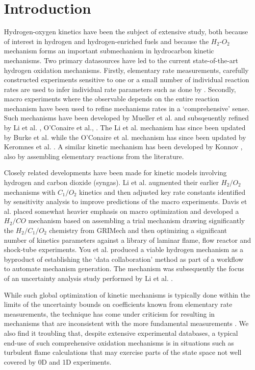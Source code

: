 \documentclass[preprint,3p,times,twocolumn]{elsarticle}
\begin{document}
\section{Introduction}
Hydrogen-oxygen kinetics have been the subject of extensive study,
both because of interest in hydrogen and hydrogen-enriched fuels and
because the $H_2$-$O_2$ mechanism forms an important submechanism in
hydrocarbon kinetic mechanisms. Two primary datasources have led to
the current state-of-the-art hydrogen oxidation mechanisms. Firstly,
elementary rate measurements, carefully constructed experiments
sensitive to one or a small number of individual reaction rates are
used to infer individual rate parameters such as done by
\cite{MuellerYD98, AshmanH98}. Secondly, macro experiments where the
observable depends on the entire reaction mechanism have been used to
refine mechanisms rates in a `comprehensive' sense. Such mechanisms
have been developed by Mueller et al.  \cite{YetterDR91, MuellerKYD99}
and subsqeuently refined by Li et al.  \cite{LiZKD04}, O'Conaire et
al., \cite{OConaireCSPW04}. The Li et al.  mechanism has since been
updated by Burke et al. \cite{BurkeCDJ10, BurkeCJDK11} while the
O'Conaire et al. mechanism has since been updated by Keromnes et
al. \cite{Keromnes_Many_Curran13}. A similar kinetic mechanism has
been developed by Konnov \cite{Konnov08}, also by assembling
elementary reactions from the literature.

Closely related developments have been made for kinetic models
involving hydrogen and carbon dioxide (syngas). Li et
al. \cite{LiZKCDS07} augmented their earlier $H_2/O_2$ mechanisms with
$C_1/O_2$ kinetics and then adjusted key rate constants identified by
sensitivity analysis to improve predictions of the macro
experiments. Davis et al.  \cite{DavisJWE05} placed somewhat heavier
emphasis on macro optimization and developed a $H_2/CO$ mechanism
based on assembling a trial mechanism drawing significantly the
$H_2/C_1/O_2$ chemistry from GRIMech \cite{GRIMech} and then
optimizing a significant number of kinetics parameters against a
library of laminar flame, flow reactor and shock-tube experiments. You
et al. \cite{YouPF11} produced a viable hydrogen mechanism as a
byproduct of establishing the `data collaboration' method as part of a
workflow to automate mechanism generation. The mechanism was
subsequently the focus of an uncertainty analysis study performed by
Li et al. \cite{LiYWL15}.

While such global optimization of kinetic mechanisms is typically done
within the limits of the uncertainty bounds on coefficients known from
elementary rate measurements, the technique has come under criticism
for resulting in mechanisms that are inconsistent with the more
fundamental measurements \cite{DavisJWE05_comment}. We also find it
troubling that, despite extensive experimental databases, a typical
end-use of such comprehensive oxidation mechanisms is in situations
such as turbulent flame calculations that may exercise parts of the
state space not well covered by 0D and 1D experiments.
\end{document}
